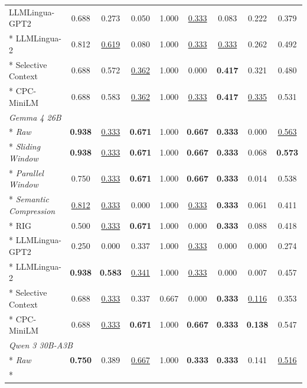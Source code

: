 {\begin{longtable}{lcc|cc|cc|c|c}
LLMLingua-GPT2                 & 0.688 & 0.273 & 0.050 & 1.000 & \underline{0.333} & 0.083 & 0.222 & 0.379 \\*
LLMLingua-2                    & 0.812 & \underline{0.619} & 0.080 & 1.000 & \underline{0.333} & \underline{0.333} & 0.262 & 0.492 \\*
Selective Context              & 0.688 & 0.572 & \underline{0.362} & 1.000 & 0.000 & \textbf{0.417} & 0.321 & 0.480 \\*
CPC-MiniLM                     & 0.688 & 0.583 & \underline{0.362} & 1.000 & \underline{0.333} & \textbf{0.417} & \underline{0.335} & 0.531 \\
\midrule
\multicolumn{9}{l}{\textit{Gemma 4 26B}} \\*
\textit{Raw}                   & \textbf{0.938} & \underline{0.333} & \textbf{0.671} & 1.000 & \textbf{0.667} & \textbf{0.333} & 0.000 & \underline{0.563} \\*
\textit{Sliding Window}        & \textbf{0.938} & \underline{0.333} & \textbf{0.671} & 1.000 & \textbf{0.667} & \textbf{0.333} & 0.068 & \textbf{0.573} \\*
\textit{Parallel Window}       & 0.750 & \underline{0.333} & \textbf{0.671} & 1.000 & \textbf{0.667} & \textbf{0.333} & 0.014 & 0.538 \\*
\textit{Semantic Compression}  & \underline{0.812} & \underline{0.333} & 0.000 & 1.000 & \underline{0.333} & \textbf{0.333} & 0.061 & 0.411 \\*
RIG                            & 0.500 & \underline{0.333} & \textbf{0.671} & 1.000 & 0.000 & \textbf{0.333} & 0.088 & 0.418 \\*
LLMLingua-GPT2                 & 0.250 & 0.000 & 0.337 & 1.000 & \underline{0.333} & 0.000 & 0.000 & 0.274 \\*
LLMLingua-2                    & \textbf{0.938} & \textbf{0.583} & \underline{0.341} & 1.000 & \underline{0.333} & 0.000 & 0.007 & 0.457 \\*
Selective Context              & 0.688 & \underline{0.333} & 0.337 & 0.667 & 0.000 & \textbf{0.333} & \underline{0.116} & 0.353 \\*
CPC-MiniLM                     & 0.688 & \underline{0.333} & \textbf{0.671} & 1.000 & \textbf{0.667} & \textbf{0.333} & \textbf{0.138} & 0.547 \\
\midrule
\multicolumn{9}{l}{\textit{Qwen 3 30B-A3B}} \\*
\textit{Raw}                   & \textbf{0.750} & 0.389 & \underline{0.667} & 1.000 & \textbf{0.333} & \textbf{0.333} & 0.141 & \underline{0.516} \\*

\end{longtable}}
